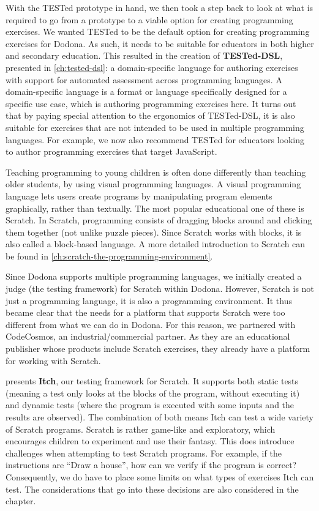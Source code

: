 \documentclass[main]{subfiles}
\begin{document}
With the TESTed prototype in hand, we then took a step back to look at what is required to go from a prototype to a viable option for creating programming exercises.
We wanted TESTed to be the default option for creating programming exercises for Dodona.
As such, it needs to be suitable for educators in both higher and secondary education.
This resulted in the creation of \textbf{TESTed-DSL}, presented in \cref{ch:tested-dsl}: a domain-specific language for authoring exercises with support for automated assessment across programming languages.
A domain-specific language is a format or language specifically designed for a specific use case, which is authoring programming exercises here.
It turns out that by paying special attention to the ergonomics of TESTed-DSL, it is also suitable for exercises that are not intended to be used in multiple programming languages.
For example, we now also recommend TESTed for educators looking to author programming exercises that target JavaScript.

Teaching programming to young children is often done differently than teaching older students, by using visual programming languages.
A visual programming language lets users create programs by manipulating program elements graphically, rather than textually.
The most popular educational one of these is Scratch.
In Scratch, programming consists of dragging blocks around and clicking them together (not unlike puzzle pieces).
Since Scratch works with blocks, it is also called a block-based language.
A more detailed introduction to Scratch can be found in \cref{ch:scratch-the-programming-environment}.

Since Dodona supports multiple programming languages, we initially created a judge (the testing framework) for Scratch within Dodona.
However, Scratch is not just a programming language, it is also a programming environment.
It thus became clear that the needs for a platform that supports Scratch were too different from what we can do in Dodona.
For this reason, we partnered with CodeCosmos, an industrial/commercial partner.
As they are an educational publisher whose products include Scratch exercises, they already have a platform for working with Scratch.

 presents \textbf{Itch}, our testing framework for Scratch.
It supports both static tests (meaning a test only looks at the blocks of the program, without executing it) and dynamic tests (where the program is executed with some inputs and the results are observed).
The combination of both means Itch can test a wide variety of Scratch programs.
Scratch is rather game-like and exploratory, which encourages children to experiment and use their fantasy.
This does introduce challenges when attempting to test Scratch programs.
For example, if the instructions are ``Draw a house'', how can we verify if the program is correct?
Consequently, we do have to place some limits on what types of exercises Itch can test.
The considerations that go into these decisions are also considered in the chapter.
\end{document}
